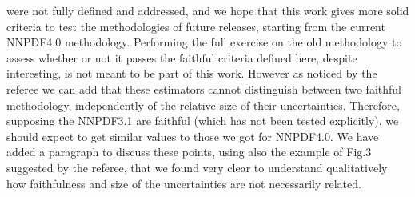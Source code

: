 \documentclass[11pt,a4paper]{article}
\numberwithin{equation}{section}
\numberwithin{figure}{section}
\numberwithin{table}{section}
\begin{document}
\begin{enumerate}
    were not fully defined and addressed, and we hope that this work gives more solid criteria 
    to test the methodologies of future releases, starting from the current NNPDF4.0 methodology.
    Performing the full exercise on the old methodology to assess whether or not it passes the faithful
    criteria defined here, despite interesting, is not meant to be part of this work.
    However as noticed by the referee we can add that these estimators cannot distinguish 
    between two faithful methodology, independently of the relative size of their uncertainties.
    Therefore, supposing the NNPDF3.1 are faithful (which has not been tested explicitly),
    we should expect to get similar values to those we got for NNPDF4.0.
    We have added a paragraph to discuss these points, using also the example of Fig.3 suggested by the referee,
    that we found very clear to understand qualitatively how faithfulness and size of the uncertainties are 
    not necessarily related. 


\end{enumerate}
\end{document}
